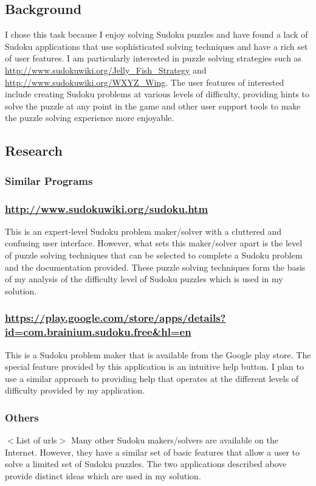 \documentclass[fleqn]{article}
\begin{document}
\subsection{Background}
I chose this task because I enjoy solving Sudoku puzzles and have found a lack of Sudoku applications that use sophisticated solving techniques and have a rich set of user features. I am particularly interested in puzzle solving strategies such as \url{http://www.sudokuwiki.org/Jelly_Fish_Strategy} and \url{http://www.sudokuwiki.org/WXYZ_Wing}. The user features of interested include creating Sudoku problems at various levels of difficulty, providing hints to solve the puzzle at any point in the game and other user support tools to make the puzzle solving experience more enjoyable.

\subsection{Research}
\subsubsection{Similar Programs}
\subsubsection*{\url{http://www.sudokuwiki.org/sudoku.htm}}
This is an expert-level Sudoku problem maker/solver with a cluttered and confusing user interface. However, what sets this maker/solver apart is the level of puzzle solving techniques that can be selected to complete a Sudoku problem and the documentation provided. These puzzle solving techniques form the basis of my analysis of the difficulty level of Sudoku puzzles which is used in my solution.

\subsubsection*{\url{https://play.google.com/store/apps/details?id=com.brainium.sudoku.free&hl=en}}
This is a Sudoku problem maker that is available from the Google play store. The special feature provided by this application is an intuitive help button. I plan to use a similar approach to providing help that operates at the different levels of difficulty provided by my application.

\subsubsection*{Others}
$<$List of urls$>$
Many other Sudoku makers/solvers are available on the Internet. However, they have a similar set of basic features that allow a user to solve a limited set of Sudoku puzzles. The two applications described above provide distinct ideas which are used in my solution.
\end{document}
